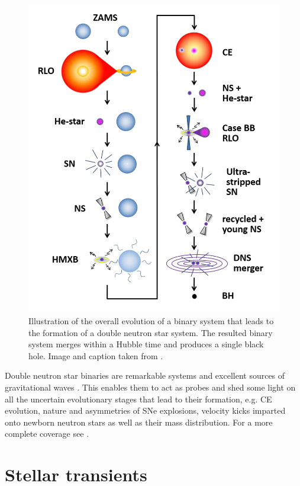 \documentclass[../../main/thesis_msc.tex]{subfiles}
\begin{document}
				\begin{figure}[h]
					\centering
					\includegraphics[scale = 0.85]{../figures/chapter1/DNS_formation_transparent.png}
					\caption{Illustration of the overall evolution of a binary system that leads to the formation of a double neutron star system. The resulted binary system merges within a Hubble time and produces a single black hole. Image and caption taken from \cite{Tauris2017}.}
					\label{fig:DNS}
				\end{figure}
				
				Double neutron star binaries are remarkable systems and excellent sources of gravitational waves \citep{ligo}. This enables them to act as probes and shed some light on all the uncertain evolutionary stages that lead to their formation, e.g. CE evolution, nature and asymmetries of SNe explosions, velocity kicks imparted onto newborn neutron stars as well as their mass distribution. For a more complete coverage see \cite[][]{Tauris2017, Ivanova_DNS, Dewi_DNS}.
				
	\section{Stellar transients}
	
\end{document}
